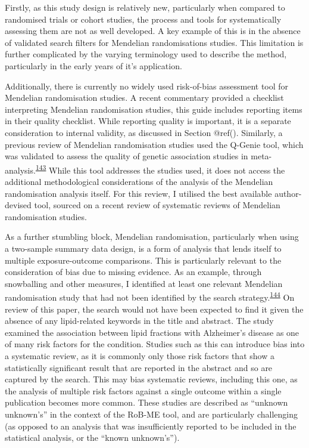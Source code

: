 \documentclass[a4paper, twoside]{templates/ociamthesis}
\begin{document}
Firstly, as this study design is relatively new, particularly when compared to randomised trials or cohort studies, the process and tools for systematically assessing them are not as well developed. A key example of this is in the absence of validated search filters for Mendelian randomisations studies. This limitation is further complicated by the varying terminology used to describe the method, particularly in the early years of it's application.

Additionally, there is currently no widely used risk-of-bias assessment tool for Mendelian randomisation studies. A recent commentary provided a checklist interpreting Mendelian randomisation studies, this guide includes reporting items in their quality checklist. While reporting quality is important, it is a separate consideration to internal validity, as discussed in Section @ref(). Similarly, a previous review of Mendelian randomisation studies used the Q-Genie tool, which was validated to assess the quality of genetic association studies in meta-analysis.\textsuperscript{\protect\hyperlink{ref-sohani2015}{143}} While this tool addresses the studies used, it does not access the additional methodological considerations of the analysis of the Mendelian randomisation analysis itself. For this review, I utilised the best available author-devised tool, sourced on a recent review of systematic reviews of Mendelian randomisation studies.

As a further stumbling block, Mendelian randomisation, particularly when using a two-sample summary data design, is a form of analysis that lends itself to multiple exposure-outcome comparisons. This is particularly relevant to the consideration of bias due to missing evidence. As an example, through snowballing and other measures, I identified at least one relevant Mendelian randomisation study that had not been identified by the search strategy.\textsuperscript{\protect\hyperlink{ref-larsson2017b}{144}} On review of this paper, the search would not have been expected to find it given the absence of any lipid-related keywords in the title and abstract. The study examined the association between lipid fractions with Alzheimer's disease as one of many risk factors for the condition. Studies such as this can introduce bias into a systematic review, as it is commonly only those risk factors that show a statistically significant result that are reported in the abstract and so are captured by the search. This may bias systematic reviews, including this one, as the analysis of multiple risk factors against a single outcome within a single publication becomes more common. These studies are described as ``unknown unknown's'' in the context of the RoB-ME tool, and are particularly challenging (as opposed to an analysis that was insufficiently reported to be included in the statistical analysis, or the ``known unknown's'').
\end{document}
